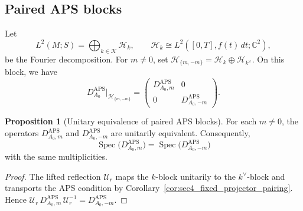 \documentclass[11pt]{article}
\newcommand{\C}{\mathbb{C}}
\theoremstyle{definition}
\newtheorem{proposition}[theorem]{Proposition}
\DeclareMathOperator{\Spec}{Spec}
\DeclareMathOperator{\APS}{APS}
\numberwithin{equation}{section}
\begin{document}
\subsection{Paired APS blocks}

Let
\begin{equation}\label{eq:sec4_fixed_L2_decomp}
L^2(M;S)
=
\bigoplus_{k\in\mathcal K}\mathcal H_k,
\qquad
\mathcal H_k\cong L^2([0,T],f(t)\,dt;\C^2),
\end{equation}
be the Fourier decomposition. For \(m\neq 0\), set \(\mathcal H_{\{m,-m\}} = \mathcal H_k\oplus\mathcal H_{k^\vee}\). On this block, we have
\begin{equation}\label{eq:sec4_fixed_block_form}
D_{A_0}^{\APS}\big|_{\mathcal H_{\{m,-m\}}}
=
\begin{pmatrix}
D_{A_0,m}^{\APS} & 0\\
0 & D_{A_0,-m}^{\APS}
\end{pmatrix}.
\end{equation}

\begin{proposition}[Unitary equivalence of paired APS blocks]
\label{lem:pairunitary}
For each \(m\neq 0\), the operators \(D_{A_0,m}^{\APS}\) and \(D_{A_0,-m}^{\APS}\) are unitarily equivalent. Consequently,
\begin{equation}\label{eq:sec4_fixed_spectral_symmetry}
\Spec\bigl(D_{A_0,m}^{\APS}\bigr)
=
\Spec\bigl(D_{A_0,-m}^{\APS}\bigr)
\end{equation}
with the same multiplicities.
\end{proposition}

\begin{proof}
The lifted reflection \(\mathcal U_r\) maps the \(k\)-block unitarily to the \(k^\vee\)-block
and transports the APS condition by
Corollary~\ref{cor:sec4_fixed_projector_pairing}. Hence \(\mathcal{U}_r\,D_{A_0,m}^{\APS}\,\mathcal{U}_r^{-1} = D_{A_0,-m}^{\APS}\).
\end{proof}
\end{document}
